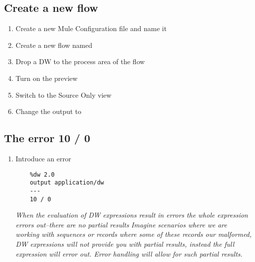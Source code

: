 \subsection{Create a new flow}
\begin{enumerate}
\item Create a new Mule Configuration file and name it 
\item Create a new flow named 
\item Drop a DW to the process area of the flow
\item Turn on the preview
\item Switch to the Source Only view
\item Change the output to 
\end{enumerate}

\subsection{The error 10 / 0}
\begin{enumerate}[resume*]
\item Introduce an error
  \begin{verbatim}
    %dw 2.0
    output application/dw
    ---
    10 / 0
  \end{verbatim}
  \emph{
    When the evaluation of DW expressions result in errors the whole expression errors out--there are no partial results
  }
  \newline
  \emph{
    Imagine scenarios where we are working with sequences or records where some of these records our malformed, DW expressions will not provide you with partial results, instead the full expression will error out.  Error handling will allow for such partial results.
  }
\end{enumerate}

